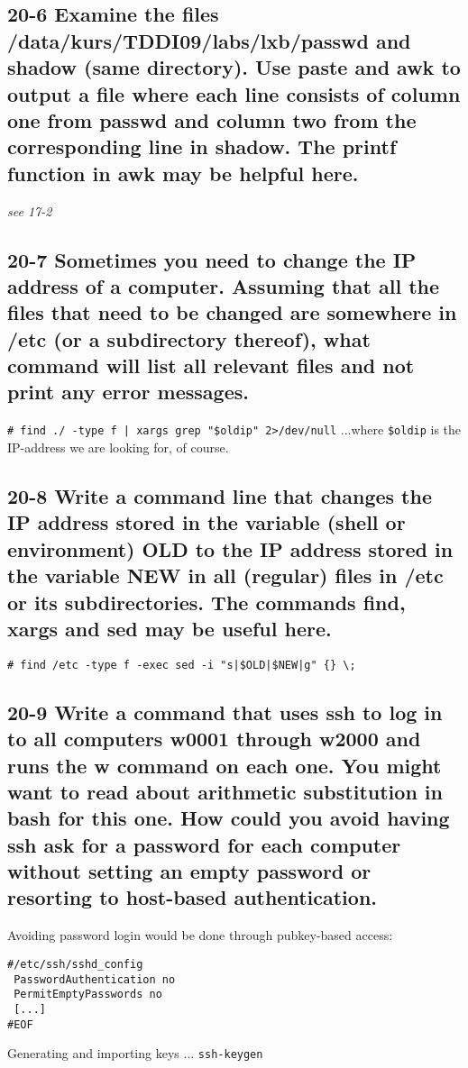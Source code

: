 \subsection{20-6 Examine the files /data/kurs/TDDI09/labs/lxb/passwd and shadow (same directory). Use paste and awk to output a file where each line consists of column one from passwd and column two from the corresponding line in shadow. The printf function in awk may be helpful here.}
\emph{see 17-2}

\subsection{20-7 Sometimes you need to change the IP address of a computer. Assuming that all the files that need to be changed are somewhere in /etc (or a subdirectory thereof), what command will list all relevant files and not print any error messages.}
\verb=# find ./ -type f | xargs grep "$oldip" 2>/dev/null=
...where \verb=$oldip= is the IP-address we are looking for, of course.

\subsection{20-8 Write a command line that changes the IP address stored in the variable (shell or environment) OLD to the IP address stored in the variable NEW in all (regular) files in /etc or its subdirectories. The commands find, xargs and sed may be useful here.}
\verb=# find /etc -type f -exec sed -i "s|$OLD|$NEW|g" {} \;=

\subsection{20-9 Write a command that uses ssh to log in to all computers w0001 through w2000 and runs the w command on each one. You might want to read about arithmetic substitution in bash for this one. How could you avoid having ssh ask for a password for each computer without setting an empty password or resorting to host-based authentication.}

Avoiding password login would be done through pubkey-based access:

\begin{verbatim}
#/etc/ssh/sshd_config
 PasswordAuthentication no
 PermitEmptyPasswords no
 [...]
#EOF
\end{verbatim}

Generating and importing keys ...
\verb=ssh-keygen=

